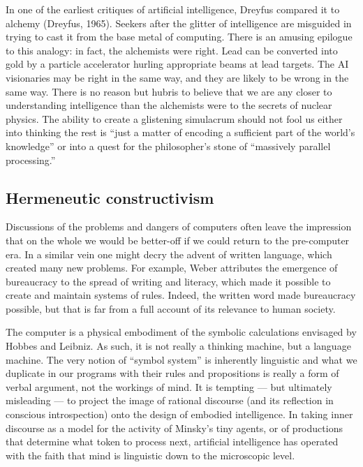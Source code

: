 \documentclass[12pt]{article}
\begin{document}
In one of the earliest critiques of artificial intelligence, Dreyfus compared it to alchemy (Dreyfus, 1965). Seekers after the glitter of intelligence are misguided in trying to cast it from the base metal of computing. There is an amusing epilogue to this analogy: in fact, the alchemists were right. Lead can be converted into gold by a particle accelerator hurling appropriate beams at lead targets. The AI visionaries may be right in the same way, and they are likely to be wrong in the same way. There is no reason but hubris to believe that we are any closer to understanding intelligence than the alchemists were to the secrets of nuclear physics. The ability to create a glistening simulacrum should not fool us either into thinking the rest is ``just a matter of encoding a sufficient part of the world's knowledge'' or into a quest for the philosopher's stone of ``massively parallel processing.''

\subsection{Hermeneutic constructivism}

Discussions of the problems and dangers of computers often leave the impression that on the whole we would be better-off if we could return to the pre-computer era. In a similar vein one might decry the advent of written language, which created many new problems. For example, Weber attributes the emergence of bureaucracy to the spread of writing and literacy, which made it possible to create and maintain systems of rules. Indeed, the written word made bureaucracy possible, but that is far from a full account of its relevance to human society.

The computer is a physical embodiment of the symbolic calculations envisaged by Hobbes and Leibniz. As such, it is not really a thinking machine, but a language machine. The very notion of ``symbol system'' is inherently linguistic and what we duplicate in our programs with their rules and propositions is really a form of verbal argument, not the workings of mind. It is tempting --- but ultimately misleading --- to project the image of rational discourse (and its reflection in conscious introspection) onto the design of embodied intelligence. In taking inner discourse as a model for the activity of Minsky's tiny agents, or of productions that determine what token to process next, artificial intelligence has operated with the faith that mind is linguistic down to the microscopic level.
\end{document}
